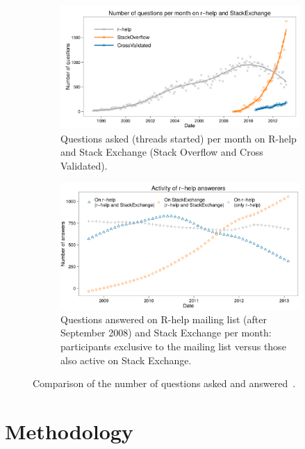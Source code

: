 \documentclass{sig-alternate-05-2015}
\begin{document}
	\begin{figure}
		\centering
	    \begin{subfigure}[b]{0.86\columnwidth}
	      \includegraphics[width=\columnwidth]{Figures/VasilescuFA1}
          \caption{Questions asked (threads started) per month on R-help and Stack Exchange (Stack Overflow and Cross Validated).}
	      \label{fig:VasilescuFA1-1}
        \end{subfigure}
	    \begin{subfigure}[b]{0.86\columnwidth}
	      \includegraphics[width=\columnwidth]{Figures/VasilescuFA2}
          \caption{Questions answered on R-help mailing list (after September 2008) and Stack Exchange per month: participants exclusive to the mailing list versus those also active on Stack Exchange.}
      	  \label{fig:VasilescuFA1-2}
        \end{subfigure}
		\caption{Comparison of the number of questions asked and answered~\cite{Vasilescu2014c}.}
		\label{fig:VasilescuFA1}
	\end{figure}


\section{Methodology}
\label{cha:methodology}
\end{document}
